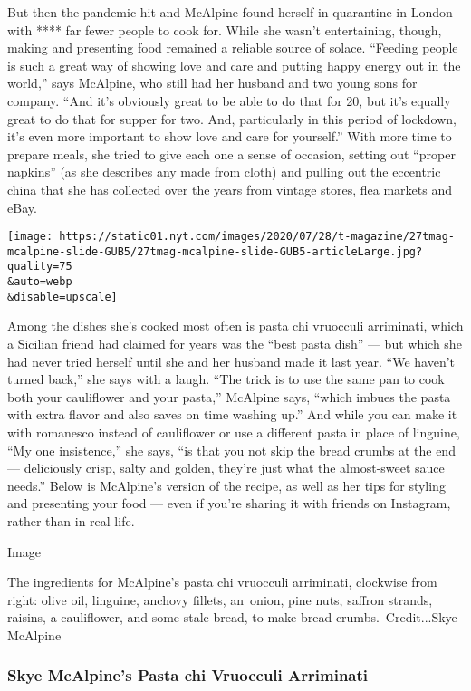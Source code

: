 But then the pandemic hit and McAlpine found herself in quarantine in
London with **** far fewer people to cook for. While she wasn't
entertaining, though, making and presenting food remained a reliable
source of solace. ``Feeding people is such a great way of showing love
and care and putting happy energy out in the world,'' says McAlpine, who
still had her husband and two young sons for company. ``And it's
obviously great to be able to do that for 20, but it's equally great to
do that for supper for two. And, particularly in this period of
lockdown, it's even more important to show love and care for yourself.''
With more time to prepare meals, she tried to give each one a sense of
occasion, setting out ``proper napkins'' (as she describes any made from
cloth) and pulling out the eccentric china that she has collected over
the years from vintage stores, flea markets and eBay.

\texttt{[image: https://static01.nyt.com/images/2020/07/28/t-magazine/27tmag-mcalpine-slide-GUB5/27tmag-mcalpine-slide-GUB5-articleLarge.jpg?quality=75\\\&auto=webp\\\&disable=upscale]}

Among the dishes she's cooked most often is pasta chi vruocculi
arriminati, which a Sicilian friend had claimed for years was the ``best
pasta dish'' --- but which she had never tried herself until she and her
husband made it last year. ``We haven't turned back,'' she says with a
laugh. ``The trick is to use the same pan to cook both your cauliflower
and your pasta,'' McAlpine says, ``which imbues the pasta with extra
flavor and also saves on time washing up.'' And while you can make it
with romanesco instead of cauliflower or use a different pasta in place
of linguine, ``My one insistence,'' she says, ``is that you not skip the
bread crumbs at the end --- deliciously crisp, salty and golden, they're
just what the almost-sweet sauce needs.'' Below is McAlpine's version of
the recipe, as well as her tips for styling and presenting your food ---
even if you're sharing it with friends on Instagram, rather than in real
life.

Image

The ingredients for McAlpine's pasta chi vruocculi arriminati, clockwise
from right: olive oil, linguine, anchovy fillets, an~onion, pine nuts,
saffron strands, raisins, a cauliflower, and some stale bread, to make
bread crumbs.~Credit...Skye McAlpine

\hypertarget{skye-mcalpines-pasta-chi-vruocculi-arriminati}{%
\subsubsection{\texorpdfstring{\textbf{Skye McAlpine's} Pasta chi
Vruocculi
Arriminati}{Skye McAlpine's Pasta chi Vruocculi Arriminati}}\label{skye-mcalpines-pasta-chi-vruocculi-arriminati}}

